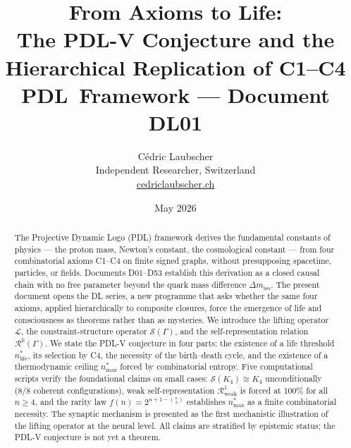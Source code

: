 \documentclass[12pt,a4paper]{article}
\theoremstyle{plain}
\theoremstyle{definition}
\theoremstyle{remark}
\newcommand{\PDL}{\textsc{PDL}}
\newcommand{\Sop}{\mathcal{S}}
\newcommand{\Rop}{\mathcal{R}}
\newcommand{\Lop}{\mathcal{L}}
\begin{document}

\title{\textbf{From Axioms to Life:\\
The \PDL-V Conjecture and the\\
Hierarchical Replication of C1--C4}\\[0.5em]
{\large \PDL\ Framework --- Document DL01}}

\author{Cédric Laubscher\\
\small Independent Researcher, Switzerland\\
\small \href{https://cedriclaubscher.ch}{cedriclaubscher.ch}}

\date{May 2026}
\maketitle

\begin{abstract}
The Projective Dynamic Logo (\PDL) framework derives the fundamental constants of
physics --- the proton mass, Newton's constant, the cosmological constant --- from
four combinatorial axioms C1--C4 on finite signed graphs, without presupposing
spacetime, particles, or fields. Documents D01--D53 establish this derivation as a
closed causal chain with no free parameter beyond the quark mass difference
$\Delta m_{\mathrm{iso}}$. The present document opens the DL series, a new programme
that asks whether the same four axioms, applied hierarchically to composite closures,
force the emergence of life and consciousness as theorems rather than as mysteries.
We introduce the lifting operator $\Lop$, the constraint-structure operator $\Sop(\Gamma)$,
and the self-representation relation $\Rop^k(\Gamma)$. We state the \PDL-V conjecture
in four parts: the existence of a life threshold $n^{*}_{\mathrm{life}}$, its selection
by C4, the necessity of the birth--death cycle, and the existence of a thermodynamic
ceiling $n^{*}_{\mathrm{max}}$ forced by combinatorial entropy. Five computational
scripts verify the foundational claims on small cases: $\Sop(K_4) \cong K_4$
unconditionally (8/8 coherent configurations), weak self-representation
$\Rop^{1}_{\mathrm{weak}}$ is forced at 100\% for all $n \geq 4$, and the rarity law
$f(n) = 2^{n+1-\binom{n}{2}}$ establishes $n^{*}_{\mathrm{max}}$ as a finite combinatorial
necessity. The synaptic mechanism is presented as the first mechanistic illustration
of the lifting operator at the neural level. All claims are stratified by epistemic
status; the \PDL-V conjecture is not yet a theorem.
\end{abstract}
\end{document}
